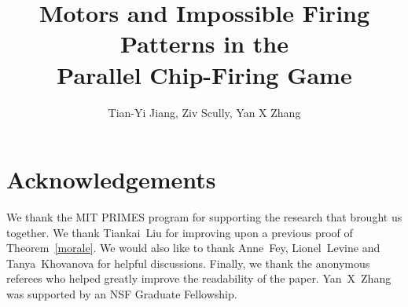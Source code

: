 \documentclass[11pt]{amsart}
\newlength{\figWidthA}
\newlength{\figWidthB}
\numberwithin{equation}{section}
\begin{document}
\setlength{}
\setlength{}

\title[Motors and Impossible Firing Patterns in the PCFG]{Motors and Impossible
  Firing Patterns in the\\Parallel Chip-Firing Game}
\author{Tian-Yi Jiang, Ziv Scully, Yan X Zhang}
\address{Massachusetts Institute of Technology}
\begin{abstract}

\end{abstract}
\maketitle

















\section*{Acknowledgements}
We thank the MIT PRIMES program for supporting the research that brought us
together. We thank Tiankai~Liu for improving upon a previous proof of
Theorem~\ref{morale}. We would also like to thank \mbox{Anne Fey}, \mbox{Lionel
  Levine} and \mbox{Tanya Khovanova} for helpful discussions. Finally, we thank
the anonymous referees who helped greatly improve the readability of the
paper. \mbox{Yan X Zhang} was supported by an NSF Graduate Fellowship.



\end{document}

